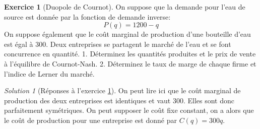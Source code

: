 \documentclass[
]{book}
\theoremstyle{definition}
\theoremstyle{definition}
\theoremstyle{definition}
\newtheorem{exercise}{Exercice}[chapter]
\theoremstyle{definition}
\theoremstyle{remark}
\newtheorem*{solution}{Solution}
\begin{document}
\begin{exercise}[Duopole de Cournot]
\protect\hypertarget{exr:cournotexo1}{}\label{exr:cournotexo1}On suppose que la demande pour l'eau de source est donnée par la fonction de demande inverse:
\[P(q)=1200-q\]
On suppose également que le coût marginal de production d'une bouteille d'eau est égal à 300. Deux entreprises se partagent le marché de l'eau et se font concurrence en quantité.
1. Déterminez les quantités produites et le prix de vente à l'équilibre de Cournot-Nash.
2. Déterminez le taux de marge de chaque firme et l'indice de Lerner du marché.
\end{exercise}

\begin{solution}[Réponses à l'exercice \ref{exr:cournotexo1}]

On peut lire ici que le coût marginal de production des deux entreprises est identiques et vaut 300.
Elles sont donc parfaitement symétriques.
On peut supposer le coût fixe constant, on a alors que le coût de production pour une entreprise est donné par \(C(q)=300q\).


\end{solution}
\end{document}
